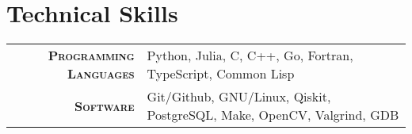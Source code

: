 \documentclass[a4paper,10pt]{article}
\begin{document}
\section{Technical Skills}
\begin{tabular}{r|p{15cm}}
    \textsc{\small \textbf {Programming Languages}} &
    Python,
    Julia,
    C,
    C++,
    Go,
    Fortran,
    TypeScript,
    Common Lisp\\

    \textsc{\small \textbf {Software}} &
    Git/Github,
    GNU/Linux,
    Qiskit,
    PostgreSQL,
    Make,
    OpenCV,
    Valgrind,
    GDB
\end{tabular}
\end{document}
